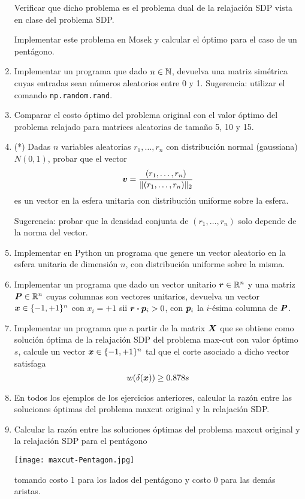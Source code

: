 \documentclass[11pt]{article}
\begin{document}
\begin{enumerate}
Verificar que dicho problema es el problema dual de la relajación SDP vista en clase del problema SDP.

Implementar este problema en Mosek y calcular el óptimo para el caso de un pentágono.

\item Implementar un programa que dado $n \in \mathbb{N}$, devuelva una matriz simétrica cuyas entradas sean números aleatorios entre 0 y 1.
Sugerencia: utilizar el comando \texttt{np.random.rand}.

\item Comparar el costo óptimo del problema original con el valor óptimo del problema relajado para matrices aleatorias de tamaño 5, 10 y 15.

\item (*) Dadas $n$ variables aleatorias $r_1, \dots, r_n$ con distribución normal (gaussiana) $N(0,1)$, probar que el vector
$$
\bm{v} = \frac{(r_1, \dots, r_n)}{\|(r_1, \dots, r_n)\|_2}
$$
es un vector en la esfera unitaria con distribución uniforme sobre la esfera.

Sugerencia: probar que la densidad conjunta de $(r_1, \dots, r_n)$ solo depende de la norma del vector.

\item Implementar en Python un programa que genere un vector aleatorio en la esfera unitaria de dimensión $n$, con distribución uniforme sobre la misma.

\item Implementar un programa que dado un vector unitario $\bm{r} \in \mathbb{R}^{n}$ y una matriz $\bm{P} \in \mathbb{R}^{n}$ cuyas columnas son vectores unitarios, devuelva un vector $\bm{x} \in \{-1, +1\}^n$ con $x_i = +1$ sii $\bm{r} \boldsymbol{\cdot} \bm{p}_i > 0$, con $\bm{p}_i$ la $i$-ésima columna de $\bm{P}$.

\item Implementar un programa que a partir de la matrix $\bm{X}$ que se obtiene como solución óptima de la relajación SDP del problema max-cut con valor óptimo $s$, calcule un vector $\bm{x} \in \{-1, +1\}^n$ tal que el corte asociado a dicho vector satisfaga
    $$
    w(\delta(\bm{x})) \ge 0.878 s
    $$

\item En todos los ejemplos de los ejercicios anteriores, calcular la razón entre las soluciones óptimas del problema maxcut original y la relajación SDP.

\item Calcular la razón entre las soluciones óptimas del problema maxcut original y la relajación SDP para el pentágono
\begin{center}
\texttt{[image: maxcut-Pentagon.jpg]}
\end{center}
tomando costo 1 para los lados del pentágono y costo 0 para las demás aristas.

\end{enumerate}
\end{document}
